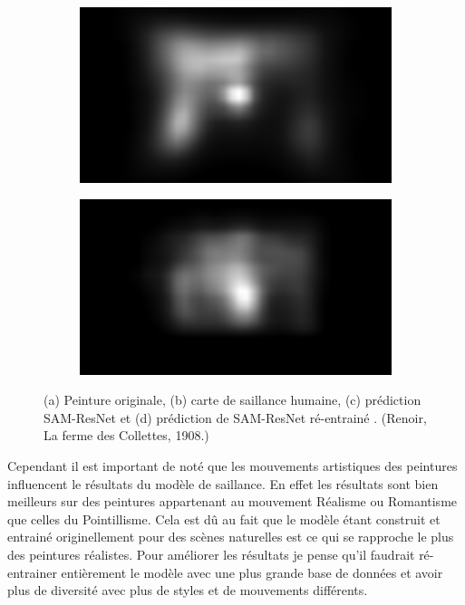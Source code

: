 \begin{figure}[ht]
    \begin{subfigure}{.49\textwidth}
        \includegraphics[width=\linewidth]{datas/samresnet/orig_La_Ferme_des_Collettes_Renoir_1908.png}
        \caption{}
    \end{subfigure}
    \begin{subfigure}{.49\textwidth}
        \includegraphics[width=\linewidth]{datas/samresnet/retrain_La_Ferme_des_Collettes_Renoir_1908.png}
        \caption{}
    \end{subfigure}
    \caption{(a) Peinture originale, (b) carte de saillance humaine, (c) prédiction SAM-ResNet et (d) prédiction de SAM-ResNet ré-entrainé . (Renoir, La ferme des Collettes, 1908.)}
    \label{fig:avantapres}
\end{figure}

\par
Cependant il est important de noté que les mouvements artistiques des peintures influencent le résultats du modèle de saillance. En effet les résultats sont bien meilleurs sur des peintures appartenant au mouvement Réalisme ou Romantisme que celles du Pointillisme. Cela est dû au fait que le modèle étant construit et entrainé originellement pour des scènes naturelles est ce qui se rapproche le plus des peintures réalistes. Pour améliorer les résultats je pense qu'il faudrait ré-entrainer entièrement le modèle avec une plus grande base de données et avoir plus de diversité avec plus de styles et de mouvements différents.